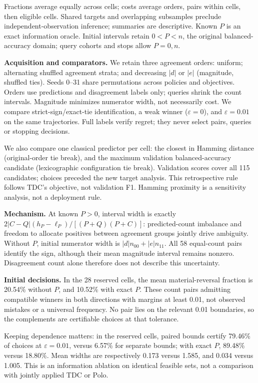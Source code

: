 \documentclass[a4paper]{esannV2}
\begin{document}
Fractions average equally across cells; costs average orders, pairs within
cells, then eligible cells. Shared targets and overlapping subsamples preclude
independent-observation inference; summaries are descriptive. Known $P$ is
an exact information oracle. Initial intervals retain $0<P<n$, the original
balanced-accuracy domain; query cohorts and stops allow $P=0,n$.

\smallskip\noindent\textbf{Acquisition and comparators.} We retain three agreement orders:
uniform; alternating shuffled agreement strata; and decreasing $|d|$ or $|e|$
(magnitude, shuffled ties). Seeds 0--31 share permutations across policies and
objectives. Orders use predictions and disagreement labels only; queries shrink
the count intervals. Magnitude minimizes numerator width, not necessarily cost.
We compare strict-sign/exact-tie identification, a weak winner ($\varepsilon=0$),
and $\varepsilon=0.01$ on the same trajectories. Full labels verify regret;
they never select pairs, queries or stopping decisions.

We also compare one classical predictor per cell: the closest in Hamming
distance (original-order tie break), and the maximum validation
balanced-accuracy candidate (lexicographic configuration tie break).
Validation scores cover all 115 candidates; choices preceded the new target
analysis. This retrospective rule follows TDC's
objective, not validation F1. Hamming proximity is a sensitivity analysis,
not a deployment rule.

\smallskip\noindent\textbf{Mechanism.} At known $P>0$, interval width is exactly
$2|C-Q|(h_P-\ell_P)/[(P+Q)(P+C)]$: predicted-count imbalance and freedom to
allocate positives between agreement groups jointly drive ambiguity.
Without $P$, initial numerator width is $|d|n_{00}+|e|n_{11}$. All 58 equal-count
pairs identify the sign, although their mean magnitude interval remains nonzero.
Disagreement count alone therefore does not describe this uncertainty.

\smallskip\noindent\textbf{Initial decisions.} In the 28 reserved
cells, the mean material-reversal fraction is 20.54\% without $P$, and 10.52\%
with exact $P$. These count pairs admitting compatible winners in both
directions with margins at least 0.01, not observed mistakes or a universal
frequency. No pair lies on the relevant 0.01 boundaries, so the complements
are certifiable choices at that tolerance.

Keeping dependence matters: in the reserved cells, paired bounds
certify 79.46\% of choices at $\varepsilon=0.01$, versus 6.57\% for separate
bounds; with exact $P$, 89.48\% versus 18.80\%. Mean widths are respectively
0.173 versus 1.585, and 0.034 versus 1.005. This is an information ablation
on identical feasible sets, not a comparison with jointly applied TDC or Polo.
\end{document}
